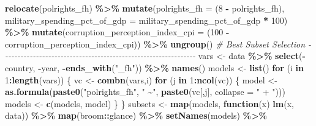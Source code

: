 \documentclass[
  english,
  man,floatsintext]{apa6}
\newenvironment{Shaded}{\begin{snugshade}}{\end{snugshade}}
\newcommand{\CommentTok}[1]{\textcolor[rgb]{0.56,0.35,0.01}{\textit{#1}}}
\newcommand{\ControlFlowTok}[1]{\textcolor[rgb]{0.13,0.29,0.53}{\textbf{#1}}}
\newcommand{\DataTypeTok}[1]{\textcolor[rgb]{0.13,0.29,0.53}{#1}}
\newcommand{\DecValTok}[1]{\textcolor[rgb]{0.00,0.00,0.81}{#1}}
\newcommand{\KeywordTok}[1]{\textcolor[rgb]{0.13,0.29,0.53}{\textbf{#1}}}
\newcommand{\NormalTok}[1]{#1}
\newcommand{\OperatorTok}[1]{\textcolor[rgb]{0.81,0.36,0.00}{\textbf{#1}}}
\newcommand{\StringTok}[1]{\textcolor[rgb]{0.31,0.60,0.02}{#1}}
\begin{document}
\begin{Shaded}
\begin{Highlighting}[]
\StringTok{  }\KeywordTok{relocate}\NormalTok{(polrights\_fh) }\OperatorTok{\%\textgreater{}\%}\StringTok{ }
\StringTok{  }\KeywordTok{mutate}\NormalTok{(}\DataTypeTok{polrights\_fh =}\NormalTok{ (}\DecValTok{8} \OperatorTok{{-}}\StringTok{ }\NormalTok{polrights\_fh),}
 \DataTypeTok{military\_spending\_pct\_of\_gdp =}\NormalTok{ military\_spending\_pct\_of\_gdp }\OperatorTok{*}\StringTok{ }\DecValTok{100}\NormalTok{) }\OperatorTok{\%\textgreater{}\%}\StringTok{ }
\StringTok{  }\KeywordTok{mutate}\NormalTok{(}\DataTypeTok{corruption\_perception\_index\_cpi =}\NormalTok{ (}\DecValTok{100} \OperatorTok{{-}}\StringTok{ }\NormalTok{corruption\_perception\_index\_cpi)) }\OperatorTok{\%\textgreater{}\%}\StringTok{ }
\StringTok{  }\KeywordTok{ungroup}\NormalTok{()}
\CommentTok{\# Best Subset Selection {-}{-}{-}{-}{-}{-}{-}{-}{-}{-}{-}{-}{-}{-}{-}{-}{-}{-}{-}{-}{-}{-}{-}{-}{-}{-}{-}{-}{-}{-}{-}{-}{-}{-}{-}{-}{-}{-}{-}{-}{-}{-}{-}{-}{-}{-}{-}{-}{-}{-}{-}{-}{-}{-}{-}{-}{-}{-}{-}{-}{-}{-}{-}}
\NormalTok{vars \textless{}{-}}\StringTok{ }\NormalTok{data }\OperatorTok{\%\textgreater{}\%}\StringTok{ }
\StringTok{  }\KeywordTok{select}\NormalTok{(}\OperatorTok{{-}}\NormalTok{country, }\OperatorTok{{-}}\NormalTok{year, }\OperatorTok{{-}}\KeywordTok{ends\_with}\NormalTok{(}\StringTok{"\_fh"}\NormalTok{)) }\OperatorTok{\%\textgreater{}\%}
\StringTok{  }\KeywordTok{names}\NormalTok{()}
\NormalTok{models \textless{}{-}}\StringTok{ }\KeywordTok{list}\NormalTok{()}
\ControlFlowTok{for}\NormalTok{ (i }\ControlFlowTok{in} \DecValTok{1}\OperatorTok{:}\KeywordTok{length}\NormalTok{(vars)) \{}
\NormalTok{  vc \textless{}{-}}\StringTok{ }\KeywordTok{combn}\NormalTok{(vars,i)}
  \ControlFlowTok{for}\NormalTok{ (j }\ControlFlowTok{in} \DecValTok{1}\OperatorTok{:}\KeywordTok{ncol}\NormalTok{(vc)) \{}
\NormalTok{    model \textless{}{-}}\StringTok{ }\KeywordTok{as.formula}\NormalTok{(}\KeywordTok{paste0}\NormalTok{(}\StringTok{"polrights\_fh"}\NormalTok{, }\StringTok{" \textasciitilde{}"}\NormalTok{, }\KeywordTok{paste0}\NormalTok{(vc[,j], }\DataTypeTok{collapse =} \StringTok{" + "}\NormalTok{)))}
\NormalTok{    models \textless{}{-}}\StringTok{ }\KeywordTok{c}\NormalTok{(models, model)}
\NormalTok{    \}}
\NormalTok{  \}}
\NormalTok{subsets \textless{}{-}}\StringTok{ }\KeywordTok{map}\NormalTok{(models, }\ControlFlowTok{function}\NormalTok{(x) }\KeywordTok{lm}\NormalTok{(x, data)) }\OperatorTok{\%\textgreater{}\%}\StringTok{ }
\StringTok{  }\KeywordTok{map}\NormalTok{(broom}\OperatorTok{::}\NormalTok{glance) }\OperatorTok{\%\textgreater{}\%}\StringTok{ }
\StringTok{  }\KeywordTok{setNames}\NormalTok{(models) }\OperatorTok{\%\textgreater{}\%}\StringTok{ }

\end{Highlighting}
\end{Shaded}
\end{document}
